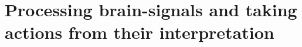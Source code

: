 
\glsresetall

\chapter{Processing brain-signals and taking actions from their interpretation}
\label{ch:processing_signals}



